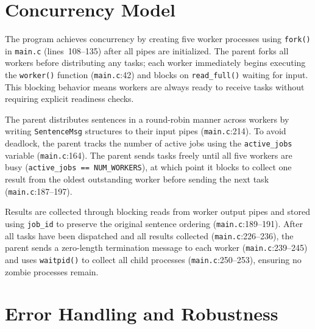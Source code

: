 \documentclass[12pt]{article}
\begin{document}
\section{Concurrency Model}

The program achieves concurrency by creating five worker processes using
\texttt{fork()} in \texttt{main.c} (lines~108--135) after all pipes are
initialized. The parent forks all workers before distributing any tasks;
each worker immediately begins executing the \texttt{worker()} function
(\texttt{main.c}:42) and blocks on \texttt{read\_full()} waiting for
input. This blocking behavior means workers are always ready to receive
tasks without requiring explicit readiness checks.

The parent distributes sentences in a round-robin manner across workers by
writing \texttt{SentenceMsg} structures to their input pipes
(\texttt{main.c}:214). To avoid deadlock, the parent tracks the number of
active jobs using the \texttt{active\_jobs} variable
(\texttt{main.c}:164). The parent sends tasks freely until all five
workers are busy (\texttt{active\_jobs == NUM\_WORKERS}), at which point
it blocks to collect one result from the oldest outstanding worker before
sending the next task (\texttt{main.c}:187--197).

Results are collected through blocking reads from worker output pipes and
stored using \texttt{job\_id} to preserve the original sentence ordering
(\texttt{main.c}:189--191). After all tasks have been dispatched and all
results collected (\texttt{main.c}:226--236), the parent sends a
zero-length termination message to each worker
(\texttt{main.c}:239--245) and uses \texttt{waitpid()} to collect all
child processes (\texttt{main.c}:250--253), ensuring no zombie processes
remain.

\section{Error Handling and Robustness}
\end{document}
